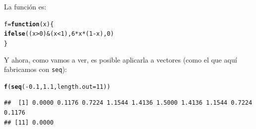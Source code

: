 \documentclass[10pt,a4paper]{article}\usepackage[]{graphicx}\usepackage[]{color}
\makeatletter
\newcommand{\hlnum}[1]{\textcolor[rgb]{0.686,0.059,0.569}{#1}}%
\newcommand{\hlopt}[1]{\textcolor[rgb]{0,0,0}{#1}}%
\newcommand{\hlstd}[1]{\textcolor[rgb]{0.345,0.345,0.345}{#1}}%
\newcommand{\hlkwa}[1]{\textcolor[rgb]{0.161,0.373,0.58}{\textbf{#1}}}%
\newcommand{\hlkwb}[1]{\textcolor[rgb]{0.69,0.353,0.396}{#1}}%
\newcommand{\hlkwc}[1]{\textcolor[rgb]{0.333,0.667,0.333}{#1}}%
\newcommand{\hlkwd}[1]{\textcolor[rgb]{0.737,0.353,0.396}{\textbf{#1}}}%
\newenvironment{kframe}{%
 \def\at@end@of@kframe{}%
 \ifinner\ifhmode%
  \def\at@end@of@kframe{\end{minipage}}%
  \begin{minipage}{\columnwidth}%
 \fi\fi%
 \def\FrameCommand##1{\hskip\@totalleftmargin \hskip-\fboxsep
 \colorbox{shadecolor}{##1}\hskip-\fboxsep
     \hskip-\linewidth \hskip-\@totalleftmargin \hskip\columnwidth}%
 \MakeFramed {\advance\hsize-\width
   \@totalleftmargin\z@ \linewidth\hsize
   \@setminipage}}%
 {\par\unskip\endMakeFramed%
 \at@end@of@kframe}
\newenvironment{knitrout}{}{} %
\makeatother
\begin{document}
La función es:
\begin{knitrout}
\color{fgcolor}\begin{kframe}
\begin{alltt}
    \hlstd{f} \hlkwb{=} \hlkwa{function}\hlstd{(}\hlkwc{x}\hlstd{)\{}
            \hlkwd{ifelse}\hlstd{((x}\hlopt{>}\hlnum{0}\hlstd{)} \hlopt{&} \hlstd{(x}\hlopt{<}\hlnum{1}\hlstd{),} \hlnum{6} \hlopt{*} \hlstd{x} \hlopt{*} \hlstd{(}\hlnum{1} \hlopt{-} \hlstd{x),} \hlnum{0}\hlstd{)}
        \hlstd{\}}
\end{alltt}
\end{kframe}
\end{knitrout}
Y ahora, como vamos a ver, es posible aplicarla a vectores (como el que aquí fabricamos con {\tt seq}):
\begin{knitrout}
\color{fgcolor}\begin{kframe}
\begin{alltt}
    \hlkwd{f}\hlstd{(}\hlkwd{seq}\hlstd{(}\hlopt{-}\hlnum{0.1}\hlstd{,} \hlnum{1.1}\hlstd{,} \hlkwc{length.out}\hlstd{=}\hlnum{11}\hlstd{))}
\end{alltt}
\begin{verbatim}
##  [1] 0.0000 0.1176 0.7224 1.1544 1.4136 1.5000 1.4136 1.1544 0.7224 0.1176
## [11] 0.0000
\end{verbatim}
\end{kframe}
\end{knitrout}
\end{document}
